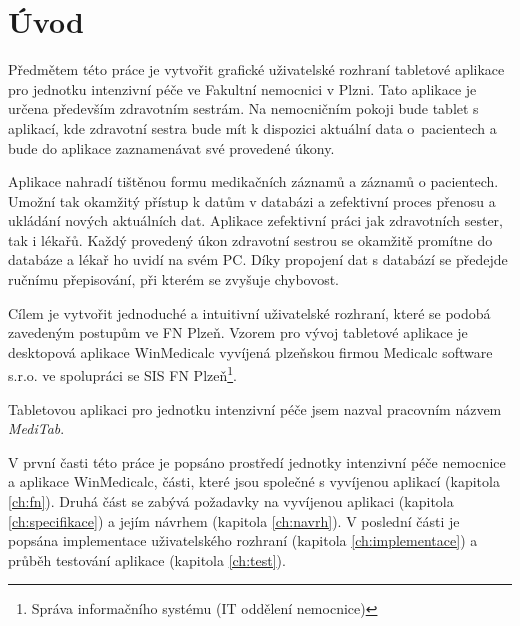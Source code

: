 \chapter*{Úvod}

Předmětem této práce je vytvořit grafické uživatelské rozhraní tabletové aplikace pro jednotku intenzivní péče ve Fakultní nemocnici v Plzni. Tato aplikace je určena především zdravotním sestrám. Na nemocničním pokoji bude tablet s aplikací, kde zdravotní sestra bude mít k dispozici aktuální data o~pacientech a bude do aplikace zaznamenávat své provedené úkony.

Aplikace nahradí tištěnou formu medikačních záznamů a záznamů o pacientech. Umožní tak okamžitý přístup k datům v databázi a zefektivní proces přenosu a ukládání nových aktuálních dat. Aplikace zefektivní práci jak zdravotních sester, tak i lékařů. Každý provedený úkon zdravotní sestrou se okamžitě promítne do databáze a lékař ho uvidí na svém PC. Díky propojení dat s databází se předejde ručnímu přepisování, při kterém se zvyšuje chybovost.

Cílem je vytvořit jednoduché a intuitivní uživatelské rozhraní, které se podobá zavedeným postupům ve FN Plzeň. Vzorem pro vývoj tabletové aplikace je desktopová aplikace WinMedicalc vyvíjená plzeňskou firmou Medicalc software s.r.o. ve spolupráci se SIS FN Plzeň\footnote{Správa informačního systému (IT oddělení nemocnice)}.

Tabletovou aplikaci pro jednotku intenzivní péče jsem nazval pracovním názvem \emph{MediTab}.

V první časti této práce je popsáno prostředí jednotky intenzivní péče nemocnice a aplikace WinMedicalc, části, které jsou společné s vyvíjenou aplikací (kapitola \ref{ch:fn}). Druhá část se zabývá požadavky na vyvíjenou aplikaci (kapitola \ref{ch:specifikace}) a jejím návrhem (kapitola \ref{ch:navrh}). V poslední části je popsána implementace uživatelského rozhraní (kapitola \ref{ch:implementace}) a průběh testování aplikace (kapitola \ref{ch:test}).